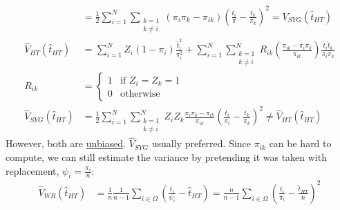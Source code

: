 \documentclass[landscape]{article}
\begin{document}
\begin{multicols*}{3}
\begin{align*}
  \\ & = \frac{1}{2} \sum_{i=1}^N \sum_{\substack{k = 1\\k \neq i}} (\pi_i\pi_k - \pi_{ik}) \left(\frac{t_i}{\pi} - \frac{t_k}{\pi_k}\right)^2
       = V_{SYG}(\hat{t}_{HT})
  \\ \hat{V}_{HT}(\hat{t}_{HT}) & = \sum_{i=1}^N Z_i (1-\pi_i) \frac{\hat{t}_i^2}{\pi_i^2} + \sum_{i=1}^N \sum_{\substack{k = 1 \\ k \neq i}}^{N}R_{ik} \left(\frac{\pi_{ik}-\pi_i\pi_k}{\pi_{ik}}\right) \frac{\hat{t}_i \hat{t}_k}{\pi_i\pi_k}
  \\ R_{ik} & =
              \begin{cases}
                1 & \text{if }Z_i = Z_k = 1
                \\ 0 & \text{otherwise}
              \end{cases}
  \\ \hat{V}_{SYG}(\hat{t}_{HT}) & = \frac{1}{2} \sum_{i=1}^N \sum_{\substack{k=1\\k \neq i}}^{N} Z_i Z_k \frac{\pi_i\pi_k-\pi_{ik}}{\pi_{ik}} \left(\frac{t_i}{\pi_i} - \frac{t_k}{\pi_k}\right)^2 \neq \hat{V}_{HT}(\hat{t}_{HT})
\end{align*}
However, both are \underline{unbiased}. $\hat{V}_{SYG}$ usually
preferred. Since $\pi_{ik}$ can be hard to compute, we can still
estimate the variance by pretending it was taken with replacement,
$\psi_i = \frac{\pi_i}{n}$:
\begin{align*}
  \hat{V}_{WR}(\hat{t}_{HT}) & = \frac{1}{n} \frac{1}{n-1} \sum_{i \in \Omega} \left(\frac{t_i}{\psi_i} - \hat{t}_{HT}\right) = \frac{n}{n-1} \sum_{i \in \Omega} \left(\frac{t_i}{\pi_i} - \frac{\hat{t}_{HT}}{n}\right)^2
\end{align*}

\end{multicols*}
\end{document}
